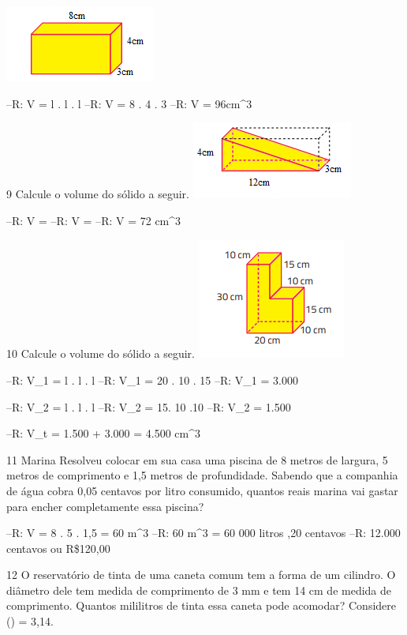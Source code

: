 {\includegraphics[width=1.94792in,height=0.98958in]{./imgSAEB_8_MAT/media/image51.png}

--R: V = l . l . l
--R: V = 8 . 4 . 3
--R: V = 96cm^3

\num{9} Calcule o volume do sólido a seguir.
\includegraphics[width=2.08333in,height=1in]{./imgSAEB_8_MAT/media/image52.png}

--R: V = 
--R: V = 
--R: V = 72 cm^3

\num{10} Calcule o volume do sólido a seguir.
\includegraphics[width=1.92708in,height=1.5625in]{./imgSAEB_8_MAT/media/image53.png}

--R: V_1 = l . l . l
--R: V_1 = 20 . 10 . 15
--R: V_1 = 3.000

--R: V_2 = l . l . l
--R: V_2 = 15. 10 .10
--R: V_2 = 1.500

--R: V_t = 1.500 + 3.000 = 4.500 cm^3

\num{11} Marina Resolveu colocar em sua casa uma piscina de 8 metros de
largura, 5 metros de comprimento e 1,5 metros de profundidade. Sabendo
que a companhia de água cobra 0,05 centavos por litro consumido, quantos
reais marina vai gastar para encher completamente essa piscina?

--R: V = 8 . 5 . 1,5 = 60 m^3
--R: 60 m^3 = 60 000 litros ,20 centavos
--R: 12.000 centavos ou R\$120,00

\num{12} O reservatório de tinta de uma caneta comum tem a forma de um
cilindro. O diâmetro dele tem medida de comprimento de 3 mm e tem 14 cm
de medida de comprimento. Quantos mililitros de tinta essa caneta pode
acomodar? Considere (\Pi) = 3,14.

}
